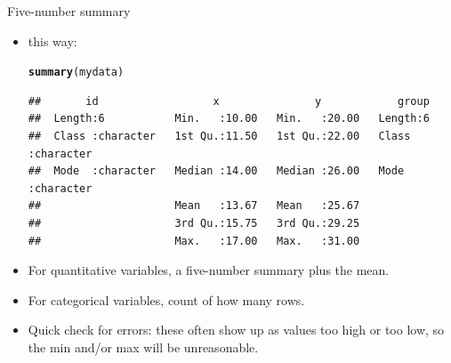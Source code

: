 \documentclass[unknownkeysallowed]{beamer}\usepackage[]{graphicx}\usepackage[]{color}
\makeatletter
\newcommand{\hlstd}[1]{\textcolor[rgb]{0.345,0.345,0.345}{#1}}%
\newcommand{\hlkwd}[1]{\textcolor[rgb]{0.737,0.353,0.396}{\textbf{#1}}}%
\newenvironment{kframe}{%
 \def\at@end@of@kframe{}%
 \ifinner\ifhmode%
  \def\at@end@of@kframe{\end{minipage}}%
  \begin{minipage}{\columnwidth}%
 \fi\fi%
 \def\FrameCommand##1{\hskip\@totalleftmargin \hskip-\fboxsep
 \colorbox{shadecolor}{##1}\hskip-\fboxsep
     \hskip-\linewidth \hskip-\@totalleftmargin \hskip\columnwidth}%
 \MakeFramed {\advance\hsize-\width
   \@totalleftmargin\z@ \linewidth\hsize
   \@setminipage}}%
 {\par\unskip\endMakeFramed%
 \at@end@of@kframe}
\newenvironment{knitrout}{}{} %
\makeatother
\begin{document}
\begin{frame}[fragile]{Five-number summary}
  
  \begin{itemize}
  \item this way:
    
\begin{knitrout}\footnotesize
{}\color{fgcolor}\begin{kframe}
\begin{alltt}
\hlkwd{summary}\hlstd{(mydata)}
\end{alltt}
\begin{verbatim}
##       id                  x               y            group          
##  Length:6           Min.   :10.00   Min.   :20.00   Length:6          
##  Class :character   1st Qu.:11.50   1st Qu.:22.00   Class :character  
##  Mode  :character   Median :14.00   Median :26.00   Mode  :character  
##                     Mean   :13.67   Mean   :25.67                     
##                     3rd Qu.:15.75   3rd Qu.:29.25                     
##                     Max.   :17.00   Max.   :31.00
\end{verbatim}
\end{kframe}
\end{knitrout}

\item For quantitative variables, a five-number summary plus the mean.
\item For categorical variables, count of how many rows.
\item Quick check for errors: these often show up as values too high
  or too low, so the min and/or max will be unreasonable.
  \end{itemize}
  
\end{frame}
\end{document}
